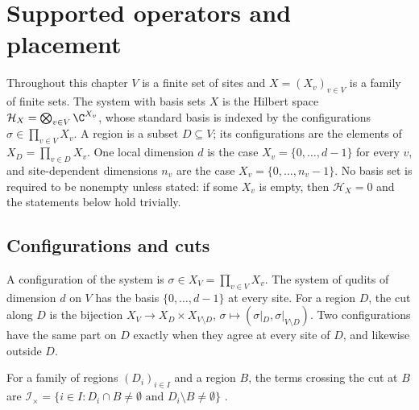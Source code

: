 \chapter{Supported operators and placement}
\label{ch:sites}

Throughout this chapter $V$ is a finite set of sites and $X=(X_v)_{v\in V}$ is
a family of finite sets. The system with basis sets $X$ is the Hilbert space
$\mathcal H_X=\bigotimes_{v\in V}\C^{X_v}$, whose standard basis is indexed by
the configurations $\sigma\in\prod_{v\in V}X_v$. A region is a subset
$D\subseteq V$; its configurations are the elements of $X_D=\prod_{v\in D}X_v$.
One local dimension $d$ is the case $X_v=\{0,\dots,d-1\}$ for every $v$, and
site-dependent dimensions $n_v$ are the case $X_v=\{0,\dots,n_v-1\}$. No basis
set is required to be nonempty unless stated: if some $X_v$ is empty, then
$\mathcal H_X=0$ and the statements below hold trivially.

\section{Configurations and cuts}
\label{sec:sites_config}

\begin{definition}
    \label{def:sites_config}
    \leanok
    A configuration of the system is $\sigma\in X_V=\prod_{v\in V}X_v$. The system of
    qudits of dimension $d$ on $V$ has the basis $\{0,\dots,d-1\}$ at every site. For a
    region $D$, the cut along $D$ is the bijection
    $X_V\to X_D\times X_{V\setminus D}$, $\sigma\mapsto(\sigma|_D,
    \sigma|_{V\setminus D})$. Two configurations have the same part on $D$
    exactly when they agree at every site of $D$, and likewise outside $D$.
\end{definition}

\begin{definition}
    \label{def:sites_crossing_terms}
    \leanok
    For a family of regions $(D_i)_{i\in I}$ and a region $B$, the terms
    crossing the cut at $B$ are
    $\mathcal I_\times=\{i\in I:D_i\cap B\neq\emptyset\text{ and }
    D_i\setminus B\neq\emptyset\}$ \cite{OpenAI2026AreaLaw}.
\end{definition}

